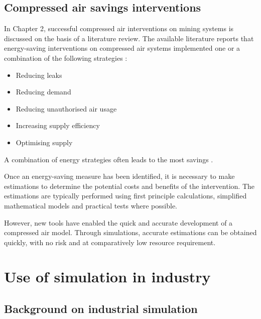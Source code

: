	\subsection{Compressed air savings interventions}
		In Chapter 2, successful compressed air interventions on mining systems is discussed on the basis of a literature review. The available literature reports that energy-saving interventions on compressed air systems implemented one or a combination of the following strategies \cite{Snyman2011Masters}:
		\begin{itemize}
			\item Reducing leaks
			\item Reducing demand
			\item Reducing unauthorised air usage
			\item Increasing supply efficiency
			\item Optimising supply
		\end{itemize}
	 A combination of energy strategies often leads to the most savings \cite{Marais2012PhD}. 
	 \par 
	 Once an energy-saving measure has been identified, it is necessary to make estimations to determine the potential costs and benefits of the intervention. The estimations are typically performed using first principle calculations, simplified mathematical models and practical tests where possible. 
	 \par 
	 However, new tools have enabled the quick and accurate development of a compressed air model. Through simulations, accurate estimations can be obtained quickly, with no risk and at comparatively low resource requirement.
\section{Use of simulation in industry }
	\subsection{Background on industrial simulation}
	
